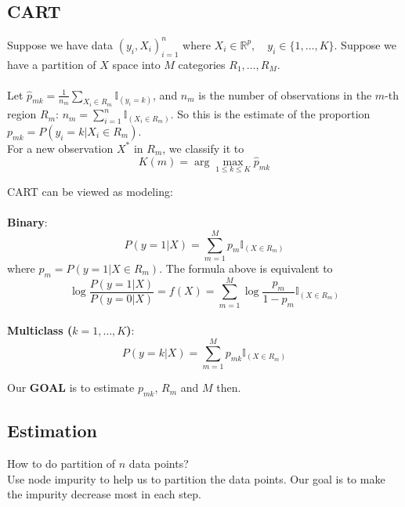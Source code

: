 \documentclass[12pt]{book}
\theoremstyle{definition}
\theoremstyle{remark}
\newcommand{\R}{\mathbb{R}}
\begin{document}
\subsection{CART}
Suppose we have data $(y_i,X_i)_{i=1}^n$ where $X_i \in \R^p,\quad y_i \in \{1,\dots,K\}$. Suppose we have a partition of $X$ space into $M$ categories $R_1, \dots, R_M$. \\
\\
Let $\hat{p}_{mk} = \frac{1}{n_m}\sum_{X_i\in R_m}\mathbb{I}_{(y_i = k)}$, and $n_m$ is the number of observations in the $m$-th region $R_m$: $n_m = \sum_{i=1}^n \mathbb{I}_{(X_i\in R_m)}$. So this is the estimate of the proportion $p_{mk} = P(y_i = k | X_i \in R_m)$.\\
For a new observation $X^*$ in $R_m$, we classify it to 
\[K(m) = \arg \max_{1\le k\le K} \hat{p}_{mk}\]

\begin{notionbox}[Notes]
    CART can be viewed as modeling:\\
    \\
    \textbf{Binary}:
    \[P(y=1|X) = \sum_{m=1}^M p_m \mathbb{I}_{(X\in R_m)}\]
    where $p_m = P(y = 1|X \in R_m)$. The formula above is equivalent to 
    \[\log \frac{P(y=1|X)}{P(y=0|X)} = f(X) = \sum_{m=1}^M \log \frac{p_m}{1-p_m}\mathbb{I}_{(X\in R_m)}\]
    \\
    \textbf{Multiclass ($k = 1,\dots,K$)}:
    \[P(y=k|X) = \sum_{m=1}^M p_{mk}\mathbb{I}_{(X\in R_m)}\]
\end{notionbox}

Our \textbf{GOAL} is to estimate $p_{mk}$, $R_m$ and $M$ then.


\subsection{Estimation}

How to do partition of $n$ data points?\\
Use node impurity to help us to partition the data points. Our goal is to make the impurity decrease most in each step.\\
\\
\end{document}
